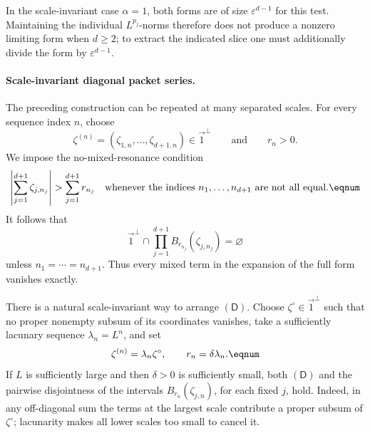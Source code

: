 In the scale-invariant case
\(\alpha=1\), both forms are of size \(\varepsilon^{d-1}\) for this test.
Maintaining the individual \(L^{p_j}\)-norms therefore does not produce a
nonzero limiting form when \(d\ge2\); to extract the indicated slice one
must additionally divide the form by \(\varepsilon^{d-1}\).

\paragraph{Scale-invariant diagonal packet series.}
The preceding construction can be repeated at many separated scales.
For every sequence index \(n\), choose
\[
  \zeta^{(n)}
  =(\zeta_{1,n},\ldots,\zeta_{d+1,n})\in\vec1^\perp
  \qquad\text{and}\qquad r_n>0.
\]
We impose the no-mixed-resonance condition
\[
  \left|\sum_{j=1}^{d+1}\zeta_{j,n_j}\right|
  >
  \sum_{j=1}^{d+1}r_{n_j}
  \quad\text{whenever the indices \(n_1,\ldots,n_{d+1}\)
  are not all equal.}
  \eqnum \label{eq:no-mixed-resonance-condition}
\]
It follows that
\[
  \vec1^\perp\cap
  \prod_{j=1}^{d+1}B_{r_{n_j}}(\zeta_{j,n_j})
  =\varnothing
\]
unless \(n_1=\cdots=n_{d+1}\).  Thus every mixed term in the expansion of
the full form vanishes exactly.

There is a natural scale-invariant way to arrange \((\mathsf D)\).  Choose
\(\zeta^\circ\in\vec1^\perp\) such that no proper nonempty subsum of its
coordinates vanishes, take a sufficiently lacunary sequence
\(\lambda_n=L^n\), and set
\[
  \zeta^{(n)}=\lambda_n\zeta^\circ,
  \qquad
  r_n=\delta\lambda_n.
  \eqnum \label{eq:lacunary-scale-choice}
\]
If \(L\) is sufficiently large and then \(\delta>0\) is sufficiently
small, both \((\mathsf D)\) and the pairwise disjointness of the intervals
\(B_{r_n}(\zeta_{j,n})\), for each fixed \(j\), hold.  Indeed, in any
off-diagonal sum the terms at the largest scale contribute a proper
subsum of \(\zeta^\circ\); lacunarity makes all lower scales too small to
cancel it.

